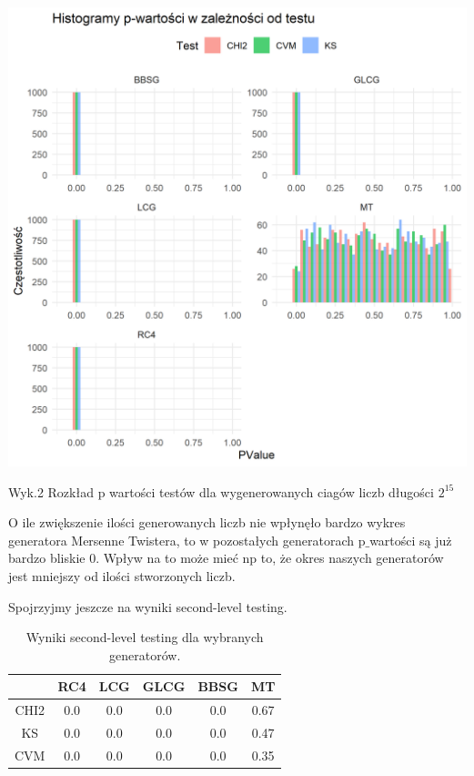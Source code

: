 \documentclass[12pt]{mwart}\usepackage[]{graphicx}\usepackage[]{xcolor}
\begin{document}
\begin{center}
\includegraphics[scale=0.7]{p_wartosc_a_test_2.png}
\caption{\newline Wyk.2 Rozkład p wartości testów dla  wygenerowanych ciagów liczb długości $2^{15}$}
\end{center}

O ile zwiększenie ilości generowanych liczb nie wpłynęło bardzo wykres generatora Mersenne Twistera, to w pozostałych generatorach p$\_$wartości są już bardzo bliskie 0. Wpływ na to może mieć np to, że okres naszych generatorów jest mniejszy od ilości stworzonych liczb.

Spojrzyjmy jeszcze na wyniki second-level testing.

\begin{table}[h!]
\centering
\begin{tabular}{|c|c|c|c|c|c|}
\hline
 & RC4 & LCG & GLCG & BBSG & MT \\ \hline
CHI2 & 0.0 & 0.0 & 0.0 & 0.0 & 0.67 \\ \hline
KS & 0.0 & 0.0 & 0.0 & 0.0 & 0.47 \\ \hline
CVM & 0.0 & 0.0 & 0.0 & 0.0 & 0.35 \\ \hline
\end{tabular}
\caption{Wyniki second-level testing dla wybranych generatorów.}
\label{tab:zero_table}
\end{table}
\end{document}
